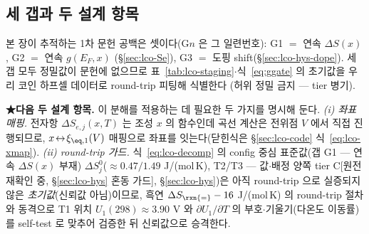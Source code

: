 \subsection{세 갭과 두 설계 항목}\label{sec:lco-decomp-gaps}
본 장이 추적하는 1차 문헌 공백은 셋이다(G$n$ 은 그 일련번호): G1 $=$ 연속 $\Delta S(x)$, G2 $=$ 연속 $g(E_F,x)$
(\S\ref{sec:lco-Se}), G3 $=$ 도핑 shift(\S\ref{sec:lco-hys-dope}). 세 갭 모두 정밀값이 문헌에 없으므로
표~\ref{tab:lco-staging}$\cdot$식~\eqref{eq:ggate} 의 초기값을 우리 코인 하프셀 데이터로 round-trip 피팅해 식별한다
(허위 정밀 금지 --- tier 병기).

\textbf{★다음 두 설계 항목.} 이 분해를 적용하는 데 필요한 두 가지를 명시해 둔다.
\emph{(i) 좌표 매핑.} 전자항 $\Delta S_{e,j}(x,T)$ 는 조성 $x$ 의 함수인데 곡선 계산은 전위점 $V$ 에서 직접 진행되므로,
$x\!\leftrightarrow\!\xi_{\eq,1}(V)$ 매핑으로 좌표를 잇는다(닫힌식은 \S\ref{sec:lco-code} 식~\eqref{eq:lco-xmap}).
\emph{(ii) round-trip 가드.} 식~\eqref{eq:lco-decomp} 의 config 중심 표준값(갭 G1 --- 연속 $\Delta S(x)$ 부재)
$\Delta S_j^0$($\approx0.47/1.49$ J/(mol\,K), T2/T3 --- 값$\cdot$배정 양쪽 tier C[원전 재확인 중, \S\ref{sec:lco-hys} 혼동 가드],
\S\ref{sec:lco-hys})은 아직 round-trip 으로 실증되지 않은
\emph{초기값}(신뢰값 아님)이므로, 흑연 $\Delta S_\rxn{=}-16$ J/(mol\,K) 의 round-trip 절차와 동격으로 T1 위치
$U_1(298)\approx3.90$ V 와 $\partial U_1/\partial T$ 의 부호$\cdot$기울기(다온도 이동률)를 self-test 로 맞추어
검증한 뒤 신뢰값으로 승격한다.

